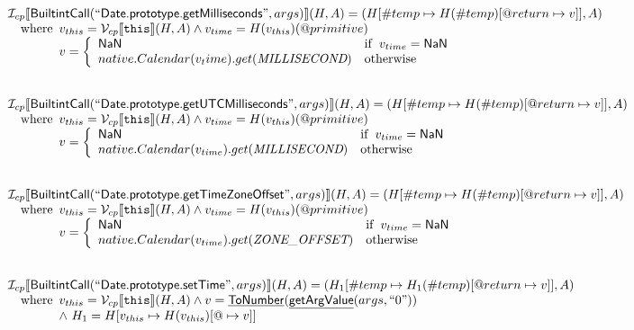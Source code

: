 \documentclass{article}
\makeatletter
\newcommand{\SF}[1]{\mbox{\textsf{#1}}}
\newcommand{\TT}[1]{\mbox{\texttt{#1}}}
\newcommand{\wherec}[1]{{\rm where}\begin{array}[t]{l}#1\end{array}}
\newcommand{\ifc}[1]{{\rm if}\begin{array}[t]{l}#1\end{array}}
\newcommand{\owc}{{\rm otherwise}}
\newcommand{\I}{\mathcal{I}}
\newcommand{\V}{\mathcal{V}}
\newcommand{\lbr}{\llbracket}
\newcommand{\rbr}{\rrbracket}
\newcommand{\hf}[1]{\underline{\sf #1}}
\newcommand{\varprop}[1]{@#1}
\makeatother
\begin{document}
\[\begin{array}{l}
\I _{cp}\lbr \SF{BuiltintCall}(``\SF{Date.prototype.getMilliseconds}",args)\rbr(H,A)
  = (H[\#temp \mapsto H(\#temp)[@return \mapsto v]], A)\\
\quad\wherec{
  v_{this} = \V _{cp}\lbr \TT{this}\rbr (H,A) \land v_{time} = H(v_{this})(@primitive)\\
  v = \left\{\begin{array}{ll}
    \SF{NaN}  & \ifc{v_{time} = \SF{NaN}}\\
    native.Calendar(v_time).get(\emph{MILLISECOND}) & \owc
    \end{array}\right.
  }\\
\\\\

\I _{cp}\lbr \SF{BuiltintCall}(``\SF{Date.prototype.getUTCMilliseconds}",args)\rbr(H,A)
  = (H[\#temp \mapsto H(\#temp)[@return \mapsto v]], A)\\
\quad\wherec{
  v_{this} = \V _{cp}\lbr \TT{this}\rbr (H,A) \land v_{time} = H(v_{this})(@primitive)\\
  v = \left\{\begin{array}{ll}
    \SF{NaN}  & \ifc{v_{time} = \SF{NaN}}\\
    native.Calendar(v_{time}).get(\emph{MILLISECOND}) & \owc
    \end{array}\right.
  }\\
\\\\

\I _{cp}\lbr \SF{BuiltintCall}(``\SF{Date.prototype.getTimeZoneOffset}",args)\rbr(H,A)
  = (H[\#temp \mapsto H(\#temp)[@return \mapsto v]], A)\\
\quad\wherec{
  v_{this} = \V _{cp}\lbr \TT{this}\rbr (H,A) \land v_{time} = H(v_{this})(@primitive)\\
  v = \left\{\begin{array}{ll}
    \SF{NaN}  & \ifc{v_{time} = \SF{NaN}}\\
    native.Calendar(v_{time}).get(\emph{ZONE\_OFFSET}) & \owc
    \end{array}\right.
  }\\
\\\\

\I _{cp}\lbr \SF{BuiltintCall}(``\SF{Date.prototype.setTime}",args)\rbr(H,A)
  = (H_1[\#temp \mapsto H_1(\#temp)[@return \mapsto v]], A)\\
\quad\wherec{
  v_{this} = \V _{cp}\lbr \TT{this}\rbr (H,A)
  \land v = \hf{ToNumber}(\hf{getArgValue}(args, ``0"))\\
  \land\ H_1 = H[v_{this} \mapsto H(v_{this})[\varprop \mapsto v]]
  }\\
\\\\


\end{array}
\]
\end{document}
